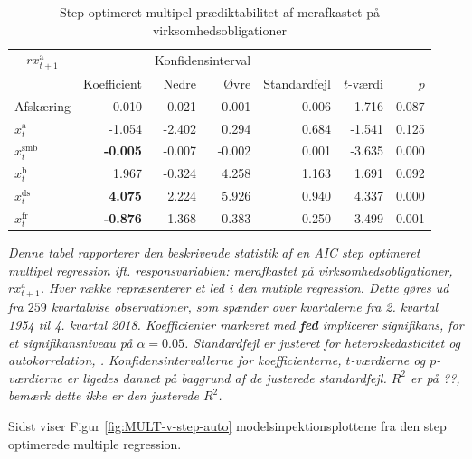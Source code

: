 \documentclass[
  a4paper,
  oneside]{memoir}
\begin{document}
\begin{table}[H]

\caption{\label{tab:MULT-step-v}Step optimeret multipel prædiktabilitet af merafkastet på virksomhedsobligationer}
\centering
\begin{threeparttable}
\begin{tabular}[t]{lrrrrrr}
\toprule
\multicolumn{1}{c}{$rx_{t+1}^{\text{a}}$} & \multicolumn{1}{c}{ } & \multicolumn{2}{c}{Konfidensinterval} & \multicolumn{3}{c}{ } \\
\cmidrule(l{3pt}r{3pt}){1-1} \cmidrule(l{3pt}r{3pt}){3-4}
  & Koefficient & Nedre & Øvre & Standardfejl & $t$-værdi & $p$\\
\midrule
\rowcolor{gray!6}  Afskæring & -0.010 & -0.021 & 0.001 & 0.006 & -1.716 & 0.087\\
$x_t^{\text{a}}$ & -1.054 & -2.402 & 0.294 & 0.684 & -1.541 & 0.125\\
\rowcolor{gray!6}  $x_t^{\text{smb}}$ & \textbf{-0.005} & -0.007 & -0.002 & 0.001 & -3.635 & 0.000\\
$x_t^{\text{b}}$ & 1.967 & -0.324 & 4.258 & 1.163 & 1.691 & 0.092\\
\rowcolor{gray!6}  $x_t^{\text{ds}}$ & \textbf{ 4.075} & 2.224 & 5.926 & 0.940 & 4.337 & 0.000\\
$x_t^{\text{fr}}$ & \textbf{-0.876} & -1.368 & -0.383 & 0.250 & -3.499 & 0.001\\
\bottomrule
\end{tabular}
\begin{tablenotes}
\item \textit{Denne tabel rapporterer den beskrivende statistik af en AIC step optimeret multipel regression ift. responsvariablen: merafkastet på virksomhedsobligationer, $rx_{t+1}^{\text{a}}$. Hver række repræsenterer et led i den mutiple regression. Dette gøres ud fra $259$ kvartalvise observationer, som spænder over kvartalerne fra 2. kvartal 1954 til 4. kvartal 2018. Koefficienter markeret med \textbf{fed} implicerer signifikans, for et signifikansniveau på $\alpha=0.05$. Standardfejl er justeret for heteroskedasticitet og autokorrelation, \citep{Newey1987}. Konfidensintervallerne for koefficienterne, $t$-værdierne og $p$-værdierne er ligedes dannet på baggrund af de justerede standardfejl. $R^2$ er på ??, bemærk dette ikke er den justerede $R^2$.}
\end{tablenotes}
\end{threeparttable}
\end{table}

Sidst viser Figur \ref{fig:MULT-v-step-auto} modelsinpektionsplottene fra den step optimerede multiple regression.
\end{document}
